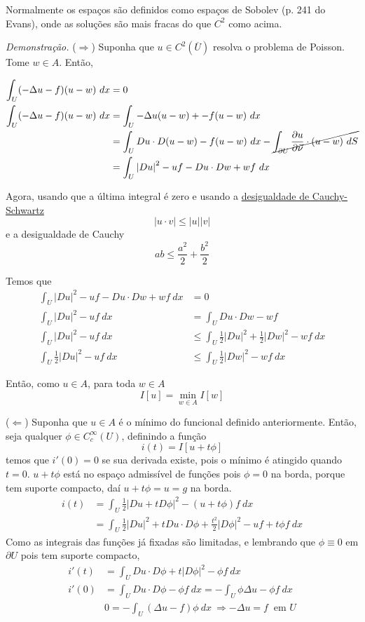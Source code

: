 \documentclass[11pt]{article}
\newcommand{\p}{\partial}
\newcommand{\pde}[2]{\frac{\p #1}{\p #2}}
\newcommand{\dirdev}[1]{\pde{#1}{\vec{\nu}}}
\begin{document}
Normalmente os espaços são definidos como espaços de Sobolev (p. 241 do Evans), onde as soluções são mais fracas do que \(C^2\) como acima.

\textit{Demonstração.} (\(\Rightarrow\)) Suponha que \(u \in C^2 (\overline{U})\) resolva o problema de Poisson. Tome \(w \in A\). Então,

\begin{align*}
	\int_U (-\Delta u - f)(u-w)\ dx &= 0 \\
	\int_U (-\Delta u - f)(u-w)\ dx &= \int_U -\Delta u (u-w) + -f(u-w)\ dx \\
	&= \int_U Du \cdot D(u-w) -f(u-w)\ dx - \cancel{\int_{\p U}\dirdev{u} \cdot (u-w) \ dS} \\
	&= \int_U \left| Du \right|^2 - uf - Du \cdot Dw + wf\ dx
\end{align*}

Agora, usando que a última integral é zero e usando a \href{https://en.wikipedia.org/wiki/Cauchy\%E2\%80\%93Schwarz_inequality}{desigualdade de Cauchy-Schwartz} \[\left| u \cdot v  \right| \leq \left| u \right| \left| v\right|\] e a desigualdade de Cauchy \[ab \leq \frac{a^2}{2} + \frac{b^2}{2} \]

Temos que \begin{align*}
	\int_U \left| Du \right|^2 - uf - Du \cdot Dw + wf\ dx &= 0 \\
	\int_U \left| Du \right|^2 - uf\ dx &= \int_U  Du \cdot Dw -  wf \\
	\int_U \left| Du \right|^2 - uf\ dx &\leq \int_U \frac{1}{2}|Du|^2 + \frac{1}{2}|Dw|^2 - wf\ dx \\
	\int_U \frac{1}{2}\left| Du \right|^2 - uf\ dx &\leq \int_U  \frac{1}{2}|Dw|^2 - wf\ dx 
\end{align*}

Então, como \(u \in A\), para toda \(w \in A\) \[I[u] = \min_{w \in A} I[w]\]

(\(\Leftarrow\)) Suponha que \(u \in A\) é o mínimo do funcional definido anteriormente. Então, seja qualquer \(\phi \in C^\infty_c (U)\), definindo a função \[i(t) = I[u + t\phi]\] temos que \(i'(0)=0\) se sua derivada existe, pois o mínimo é atingido quando \(t=0\). \(u+t\phi\) está no espaço admissível de funções pois \(\phi=0\) na borda, porque tem suporte compacto, daí \(u+t\phi=u=g\) na borda. \begin{align*}
	i(t)&=\int_U \frac{1}{2}\left| Du + tD\phi \right|^2 - (u + t\phi)f \ dx \\
	 &= \int_U \frac{1}{2} |Du|^2 + t Du \cdot D\phi + \frac{t^2}{2} |D\phi|^2 -uf + t\phi f\ dx
\end{align*}
Como as integrais das funções já fixadas são limitadas, e  lembrando que \(\phi \equiv 0 \) em \(\p U\) pois tem suporte compacto,
\begin{align*}
	i'(t) &= \int_U Du \cdot D\phi + t |D\phi|^2 - \phi f \ dx \\
	i'(0) &= \int_U Du \cdot D\phi  - \phi f\ dx = -\int_U \phi \Delta u - \phi f \ dx \\
	&0 = - \int_U (\Delta u - f) \phi\ dx\ \Rightarrow -\Delta u = f\ \text{ em } U
\end{align*}
\end{document}
